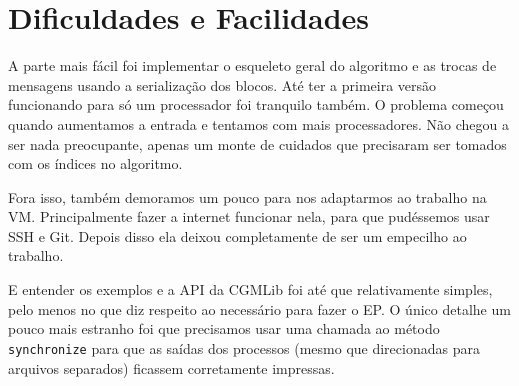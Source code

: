 \documentclass[a4paper,11pt]{article}
\begin{document}
\section{Dificuldades e Facilidades}

  A parte mais fácil foi implementar o esqueleto geral do algoritmo e as trocas
  de mensagens usando a serialização dos blocos. Até ter a primeira versão
  funcionando para só um processador foi tranquilo também. O problema começou
  quando aumentamos a entrada e tentamos com mais processadores. Não chegou a
  ser nada preocupante, apenas um monte de cuidados que precisaram ser tomados
  com os índices no algoritmo.

  Fora isso, também demoramos um pouco para nos adaptarmos ao trabalho na VM.
  Principalmente fazer a internet funcionar nela, para que pudéssemos usar SSH
  e Git. Depois disso ela deixou completamente de ser um empecilho ao trabalho.

  E entender os exemplos e a API da CGMLib foi até que relativamente simples,
  pelo menos no que diz respeito ao necessário para fazer o EP. O único detalhe
  um pouco mais estranho foi que precisamos usar uma chamada ao método
  \verb$synchronize$ para que as saídas dos processos (mesmo que direcionadas
  para arquivos separados) ficassem corretamente impressas.
\end{document}
